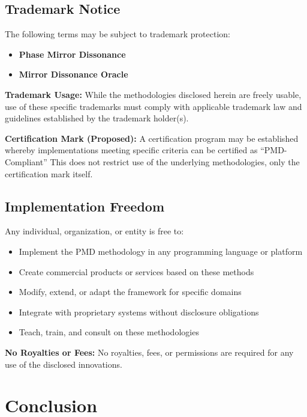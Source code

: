 \documentclass[11pt,a4paper]{article}
\begin{document}
\subsection{Trademark Notice}

The following terms may be subject to trademark protection:

\begin{itemize}
\item \textbf{Phase Mirror Dissonance}
\item \textbf{Mirror Dissonance Oracle}
\end{itemize}

\textbf{Trademark Usage:} While the methodologies disclosed herein are freely usable, use of these specific trademarks must comply with applicable trademark law and guidelines established by the trademark holder(s).

\textbf{Certification Mark (Proposed):} A certification program may be established whereby implementations meeting specific criteria can be certified as ``PMD-Compliant'' This does not restrict use of the underlying methodologies, only the certification mark itself.

\subsection{Implementation Freedom}

Any individual, organization, or entity is free to:

\begin{itemize}
\item Implement the PMD methodology in any programming language or platform
\item Create commercial products or services based on these methods
\item Modify, extend, or adapt the framework for specific domains
\item Integrate with proprietary systems without disclosure obligations
\item Teach, train, and consult on these methodologies
\end{itemize}

\textbf{No Royalties or Fees:} No royalties, fees, or permissions are required for any use of the disclosed innovations.

\section{Conclusion}
\end{document}

